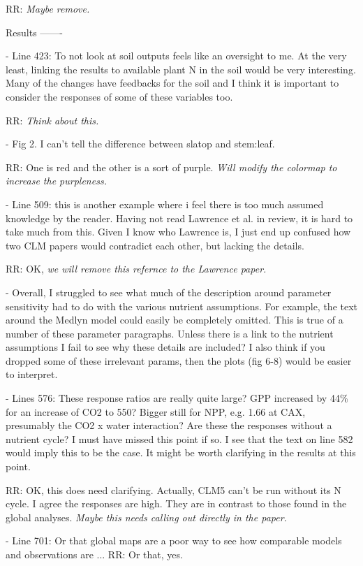 \documentclass{article}
\begin{document}
RR: \emph{Maybe remove.}

Results 
------- 

- Line 423: To not look at soil outputs feels like an oversight to me. At the very least, linking the results to available plant N in the soil would be very interesting. Many of the changes have feedbacks for the soil and I think it is important to consider the responses of some of these variables too. 

RR: \emph{Think about this.}

- Fig 2. I can't tell the difference between slatop and stem:leaf. 

RR: One is red and the other is a sort of purple. \emph{Will modify the colormap to increase the purpleness.}


- Line 509: this is another example where i feel there is too much assumed knowledge by the reader. Having not read Lawrence et al. in review, it is hard to take much from this. Given I know who Lawrence is, I just end up confused how two CLM papers would contradict each other, but lacking the details. 

RR: OK, \emph{we will remove this refernce to the Lawrence paper.}

- Overall, I struggled to see what much of the description around parameter sensitivity had to do with the various nutrient assumptions. For example, the text around the Medlyn model could easily be completely omitted. This is true of a number of these parameter paragraphs. Unless there is a link to the nutrient assumptions I fail to see why these details are included? I also think if you dropped some of these irrelevant params, then the plots (fig 6-8) would be easier to interpret. 

- Lines 576: These response ratios are really quite large? GPP increased by 44\% for an increase of CO2 to 550? Bigger still for NPP, e.g. 1.66 at CAX, presumably the CO2 x water interaction? Are these the responses without a nutrient cycle? I must have missed this point if so. I see that the text on line 582 would imply this to be the case. It might be worth clarifying in the results at this point. 

RR: OK, this does need clarifying. Actually, CLM5 can't be run without its N cycle. I agree the responses are high. They are in contrast to those found in the global analyses. \emph{Maybe this needs calling out directly in the paper. }

- Line 701: Or that global maps are a poor way to see how comparable models and observations are ... 
RR: Or that, yes. 
\end{document}
